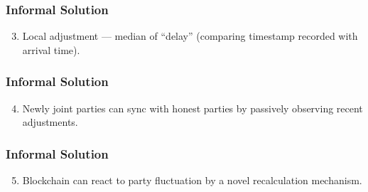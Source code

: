 \begin{frame}
    \frametitle{Informal Solution} \centering

    

    \begin{enumerate} \setcounter{enumi}{2}
        \item Local adjustment --- median of ``delay'' (comparing timestamp recorded with arrival time).
    \end{enumerate}
\end{frame}

\begin{frame}
    \frametitle{Informal Solution} \centering

    

    \begin{enumerate} \setcounter{enumi}{3}
        \item Newly joint parties can sync with honest parties by passively observing recent adjustments.
    \end{enumerate}
\end{frame}

\begin{frame}
    \frametitle{Informal Solution} \centering

    

    \begin{enumerate} \setcounter{enumi}{4}
        \item Blockchain can react to party fluctuation by a novel recalculation mechanism.
    \end{enumerate}
\end{frame}
